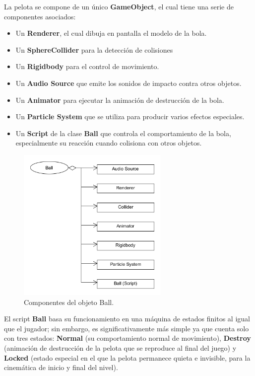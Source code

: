 La pelota se compone de un único \textbf{GameObject}, el cual tiene una serie de componentes asociados:
\begin{itemize}
\item Un \textbf{Renderer}, el cual dibuja en pantalla el modelo de la bola.
\item Un \textbf{SphereCollider} para la detección de colisiones
\item Un \textbf{Rigidbody} para el control de movimiento.
\item Un \textbf{Audio Source} que emite los sonidos de impacto contra otros objetos.
\item Un \textbf{Animator} para ejecutar la animación de destrucción de la bola.
\item Un \textbf{Particle System} que se utiliza para producir varios efectos especiales.
\item Un \textbf{Script} de la clase \textbf{Ball} que controla el comportamiento de la bola, especialmente su reacción cuando colisiona con otros objetos.
\end{itemize}

\begin{figure}[h]
	\includegraphics[width=0.65\textwidth]{images/estructura/objetos/ball}
	\centering
	\caption{Componentes del objeto Ball.}
\end{figure}

El script \textbf{Ball} basa su funcionamiento en una máquina de estados finitos al igual que el jugador; sin embargo, es significativamente más simple ya que cuenta solo con tres estados: \textbf{Normal} (su comportamiento normal de movimiento), \textbf{Destroy} (animación de destrucción de la pelota que se reproduce al final del juego) y \textbf{Locked} (estado especial en el que la pelota permanece quieta e invisible, para la cinemática de inicio y final del nivel). 

